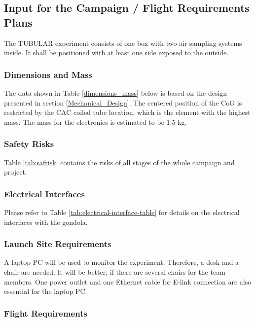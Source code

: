 \subsection{Input for the Campaign / Flight Requirements Plans}

The TUBULAR experiment consists of one box with two air sampling systems inside. It shall be positioned with at least one side exposed to the outside.

\subsubsection{Dimensions and Mass}

The data shown in Table \ref{dimensions_mass} below is based on the design presented in section \ref{Mechanical_Design}. The centered position of the CoG is restricted by the CAC coiled tube location, which is the element with the highest mass. The mass for the electronics is estimated to be 1.5 kg.  



\subsubsection{Safety Risks}
Table \ref{tab:safrisk} contains the risks of all stages of the whole campaign and project.


\pagebreak
\subsubsection{Electrical Interfaces}

Please refer to Table \ref{tab:electrical-interface-table} for details on the electrical interfaces with the gondola.



\subsubsection{Launch Site Requirements}
A laptop PC will be used to monitor the experiment. Therefore, a desk and a chair are needed. It will be better, if there are several chairs for the team members. One power outlet and one Ethernet cable for E-link connection are also essential for the laptop PC.

\subsubsection{Flight Requirements}

